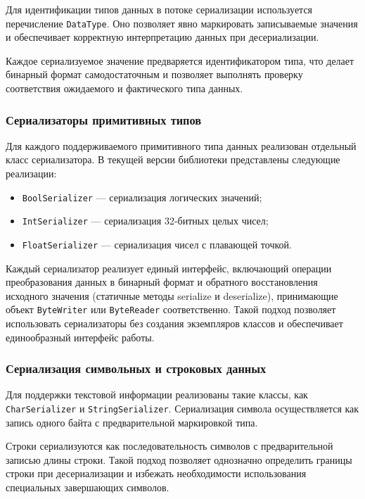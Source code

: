 \documentclass[coursework]{SCWorks}
\begin{document}
Для идентификации типов данных в потоке сериализации используется перечисление \texttt{DataType}. Оно позволяет явно маркировать записываемые значения и обеспечивает корректную интерпретацию данных при десериализации.

Каждое сериализуемое значение предваряется идентификатором типа, что делает бинарный формат самодостаточным и позволяет выполнять проверку соответствия ожидаемого и фактического типа данных.

\subsubsection{Сериализаторы примитивных типов}

Для каждого поддерживаемого примитивного типа данных реализован отдельный класс сериализатора. В текущей версии библиотеки представлены следующие реализации:

\begin{itemize}
    \item \texttt{BoolSerializer} — сериализация логических значений;
    \item \texttt{IntSerializer} — сериализация 32-битных целых чисел;
    \item \texttt{FloatSerializer} — сериализация чисел с плавающей точкой.
\end{itemize}

Каждый сериализатор реализует единый интерфейс, включающий операции преобразования данных в бинарный формат и обратного восстановления исходного значения  (статичные методы serialize и deserialize), принимающие объект \texttt{ByteWriter} или \texttt{ByteReader} соответственно. Такой подход позволяет использовать сериализаторы без создания экземпляров классов и обеспечивает единообразный интерфейс работы.

\subsubsection{Сериализация символьных и строковых данных}

Для поддержки текстовой информации реализованы такие классы, как \texttt{CharSerializer} и \texttt{StringSerializer}. Сериализация символа осуществляется как запись одного байта с предварительной маркировкой типа.

Строки сериализуются как последовательность символов с предварительной записью длины строки. Такой подход позволяет однозначно определить границы строки при десериализации и избежать необходимости использования специальных завершающих символов.
\end{document}
